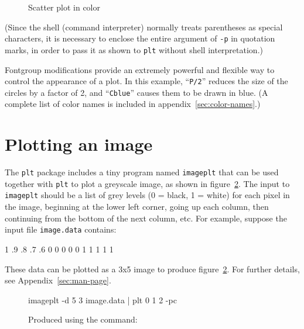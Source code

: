 \documentclass{book}
\begin{document}
\begin{figure}
\begin{center}
\caption{Scatter plot in color \label{fig:simple5}}
\end{center}
\end{figure}

(Since the shell (command interpreter) normally treats parentheses as
special characters, it is necessary to enclose the entire argument of
{\tt -p} in quotation marks, in order to pass it as shown to {\tt plt}
without shell interpretation.)

Fontgroup modifications provide an extremely powerful and flexible way to
control the appearance of a plot.  In this example, ``{\tt P/2}''
reduces the size of the circles by a factor of 2, and ``{\tt Cblue}''
causes them to be drawn in blue.  (A complete list of color names is
included in appendix~\ref{sec:color-names}.)

\section{Plotting an image}

%
%
The {\tt plt} package includes a tiny program named {\tt imageplt} that
can be used together with {\tt plt} to plot a greyscale image, as shown
in figure~\ref{fig:image}.  The input to {\tt imageplt} should be a list
of grey levels (0 = black, 1 = white) for each pixel in the image, beginning
at the lower left corner, going up each column, then continuing from the
bottom of the next column, etc.  For example, suppose the input file
{\tt image.data} contains:

\begin{center}
\begin{boxedverbatim}
1 .9 .8 .7 .6
0 0 0 0 0
1 1 1 1 1
\end{boxedverbatim}
\end{center}

These data can be plotted as a 3x5 image to produce
figure~\ref{fig:image}.  For further details, see
Appendix~\ref{sec:man-page}.

\begin{figure}[h]
\begin{center}
\end{center}
\caption[Using imageplt]{Produced using the command: \label{fig:image}}
\begin{center}
\begin{boxedverbatim}
imageplt -d 5 3 image.data | plt 0 1 2 -pc
\end{boxedverbatim}
\end{center}
\end{figure}
\end{document}
